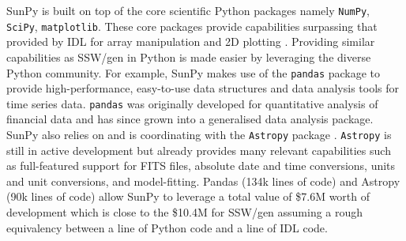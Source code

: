 SunPy is built on top of the core scientific Python packages namely 
\texttt{NumPy}, \texttt{SciPy}, \texttt{matplotlib}. These core packages 
provide capabilities surpassing that provided by IDL for array manipulation and 
2D plotting \citep{greenfield2011}. Providing similar capabilities as SSW/gen 
in Python is made easier by leveraging the diverse Python community. For 
example, SunPy makes use of the \texttt{pandas} package to provide 
high-performance, easy-to-use data structures and data analysis tools for time 
series data\citep{mckinney2012}. \texttt{pandas} was originally developed for 
quantitative analysis of financial data and has since grown into a generalised 
data analysis package. SunPy also relies on and is coordinating with the 
\texttt{Astropy} package \citep{theastropycollaboration2013}. \texttt{Astropy} is still in 
active development but already provides many relevant capabilities such as 
full-featured support for FITS files, absolute date and time conversions, 
units and unit conversions, and model-fitting. Pandas (134k lines of code) 
and Astropy (90k lines of code) allow SunPy to leverage a total value of \$7.6M 
worth of development which is close to the \$10.4M for SSW/gen assuming a rough 
equivalency between a line of Python code and a line of IDL code. 